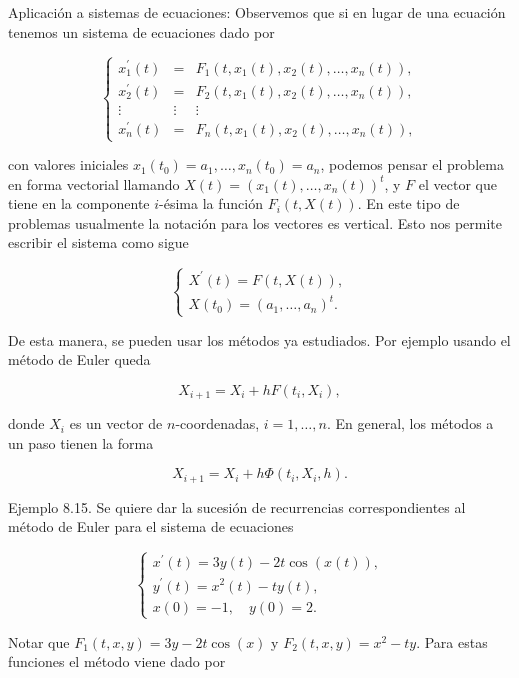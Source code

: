 \documentclass[10pt]{book}
\begin{document}
Aplicación a sistemas de ecuaciones: Observemos que si en lugar de una ecuación tenemos un sistema de ecuaciones dado por

$$
\left\{\begin{array}{ccc}
x_{1}^{\prime}(t) & = & F_{1}\left(t, x_{1}(t), x_{2}(t), \ldots, x_{n}(t)\right), \\
x_{2}^{\prime}(t) & = & F_{2}\left(t, x_{1}(t), x_{2}(t), \ldots, x_{n}(t)\right), \\
\vdots & \vdots & \vdots \\
x_{n}^{\prime}(t) & = & F_{n}\left(t, x_{1}(t), x_{2}(t), \ldots, x_{n}(t)\right),
\end{array}\right.
$$

con valores iniciales $x_{1}\left(t_{0}\right)=a_{1}, \ldots, x_{n}\left(t_{0}\right)=a_{n}$, podemos pensar el problema en forma vectorial llamando $X(t)=\left(x_{1}(t), \ldots, x_{n}(t)\right)^{t}$, y $F$ el vector que tiene en la componente $i$-ésima la función $F_{i}(t, X(t))$. En este tipo de problemas usualmente la notación para los vectores es vertical. Esto nos permite escribir el sistema como sigue

$$
\left\{\begin{array}{l}
X^{\prime}(t)=F(t, X(t)), \\
X\left(t_{0}\right)=\left(a_{1}, \ldots, a_{n}\right)^{t} .
\end{array}\right.
$$

De esta manera, se pueden usar los métodos ya estudiados. Por ejemplo usando el método de Euler queda

$$
X_{i+1}=X_{i}+h F\left(t_{i}, X_{i}\right),
$$

donde $X_{i}$ es un vector de $n$-coordenadas, $i=1, \ldots, n$. En general, los métodos a un paso tienen la forma

$$
X_{i+1}=X_{i}+h \Phi\left(t_{i}, X_{i}, h\right) .
$$

Ejemplo 8.15. Se quiere dar la sucesión de recurrencias correspondientes al método de Euler para el sistema de ecuaciones

$$
\left\{\begin{array}{l}
x^{\prime}(t)=3 y(t)-2 t \cos (x(t)), \\
y^{\prime}(t)=x^{2}(t)-t y(t), \\
x(0)=-1, \quad y(0)=2 .
\end{array}\right.
$$

Notar que $F_{1}(t, x, y)=3 y-2 t \cos (x)$ y $F_{2}(t, x, y)=x^{2}-t y$. Para estas funciones el método viene dado por
\end{document}
